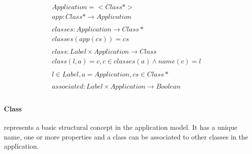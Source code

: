 \documentclass[11pt]{article}
\begin{document}
\begin{gather*}
  Application = < Class* > \\ 
  app : Class* \rightarrow  Application \\ \\
  classes : Application \rightarrow Class* \\
  classes(app(cs)) = cs  \\\\
  class : Label \times Application \rightarrow Class   \\ 
  class(l, a) = c, c \in classes(a) \wedge name(c) = l \\ \\
  l \in Label, a = Application, cs \in Class* 
  \\ \\
  associated :  Label \times Application \rightarrow Boolean \\
 \end{gather*}


\paragraph{Class} represents a basic structural concept in the application model. It has a unique name, one or more properties and a class can be associated to other classes in the application. 
\end{document}
